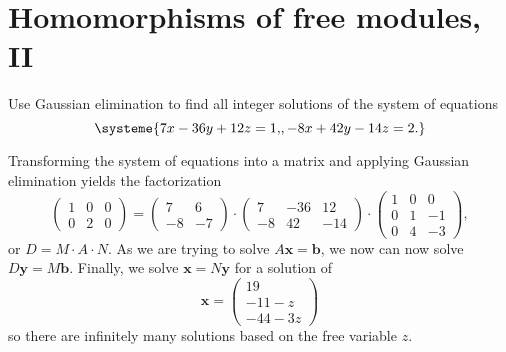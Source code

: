 \documentclass[../../master.tex]{subfiles}
\begin{document}
\section{Homomorphisms of free modules, II}

\begin{problem}
    Use Gaussian elimination to find all integer solutions of the system of equations
    \[
    \systeme{
        7x - 36y + 12z = 1\text{,},
        -8x + 42y - 14z = 2.
    }
    \]
\end{problem}

\begin{solution}
    Transforming the system of equations into a matrix and applying Gaussian elimination yields the factorization
    \[
    \begin{pmatrix}
        1 & 0 & 0 \\
        0 & 2 & 0
    \end{pmatrix} =
    \begin{pmatrix}
        7 & 6 \\
        -8 & -7
    \end{pmatrix} \cdot
    \begin{pmatrix}
        7 & -36 & 12 \\
        -8 & 42 & -14 
    \end{pmatrix} \cdot
    \begin{pmatrix}
        1 & 0 & 0 \\
        0 & 1 & -1 \\
        0 & 4 & -3
    \end{pmatrix},
    \]
    or $D = M \cdot A \cdot N$.
    As we are trying to solve $A \bm{x} = \bm{b}$, we now can now solve $D \bm{y} = M \bm{b}$.
    Finally, we solve $\bm{x} = N \bm{y}$ for a solution of
    \[
        \bm{x} = 
        \begin{pmatrix}
            19 \\
            -11 - z \\
            -44 - 3z
        \end{pmatrix}
    \]
    so there are infinitely many solutions based on the free variable $z$.
\end{solution}
\end{document}
